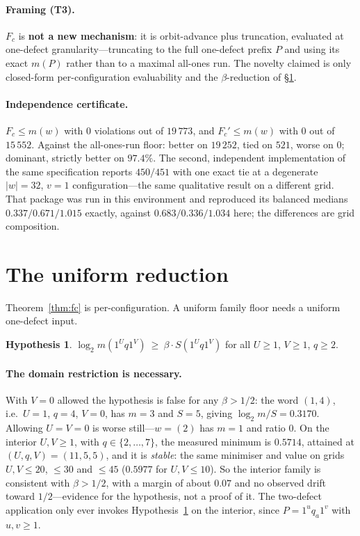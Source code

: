 \documentclass[11pt,a4paper]{article}
\theoremstyle{plain}
\theoremstyle{definition}
\newtheorem{hypo}{Hypothesis}
\newcommand{\Fc}{F_{c}}
\begin{document}
\paragraph{Framing (T3).}
$\Fc$ is \textbf{not a new mechanism}: it is orbit-advance plus truncation,
evaluated at one-defect granularity---truncating to the full one-defect prefix
$P$ and using its exact $m(P)$ rather than to a maximal all-ones run. The
novelty claimed is only closed-form per-configuration evaluability and the
$\beta$-reduction of \S\ref{sec:beta}.

\paragraph{Independence certificate.}
$\Fc\le m(w)$ with $0$ violations out of $19\,773$, and $\Fc'\le m(w)$ with $0$ out of $15\,552$. Against the
all-ones-run floor: better on $19\,252$, tied on $521$, worse on $0$;
dominant, strictly better on $97.4\%$. The second, independent implementation
of the same specification reports $450/451$ with one exact tie at a degenerate
$|w|=32$, $v=1$ configuration---the same qualitative result on a different
grid. That package was run in this environment and reproduced its balanced
medians $0.337/0.671/1.015$ exactly, against $0.683/0.336/1.034$ here; the
differences are grid composition.

\section{The uniform reduction}\label{sec:beta}

Theorem~\ref{thm:fc} is per-configuration. A uniform family floor needs a
uniform one-defect input.

\begin{hypo}\label{hyp:beta}
$\log_2 m(1^{U}q1^{V})\ \ge\ \beta\cdot S(1^{U}q1^{V})$ for all
$U\ge1$, $V\ge1$, $q\ge2$.
\end{hypo}

\paragraph{The domain restriction is necessary.}
With $V=0$ allowed the hypothesis is false for any $\beta>1/2$: the word
$(1,4)$, i.e.\ $U=1$, $q=4$, $V=0$, has $m=3$ and $S=5$, giving
$\log_2m/S=0.3170$. Allowing $U=V=0$ is worse still---$w=(2)$ has $m=1$ and
ratio $0$. On the interior $U,V\ge1$, with $q\in\{2,\dots,7\}$, the measured minimum
is $0.5714$, attained
at $(U,q,V)=(11,5,5)$, and it is \emph{stable}: the same minimiser and value
on grids $U,V\le20$, $\le30$ and $\le45$ ($0.5977$ for $U,V\le10$). So the
interior family is consistent with $\beta>1/2$, with a margin of about $0.07$
and no observed drift toward $1/2$---evidence for the hypothesis, not a proof
of it. The two-defect application only ever invokes
Hypothesis~\ref{hyp:beta} on the interior, since $P=1^{u}q_a1^{v}$ with
$u,v\ge1$.
\end{document}
